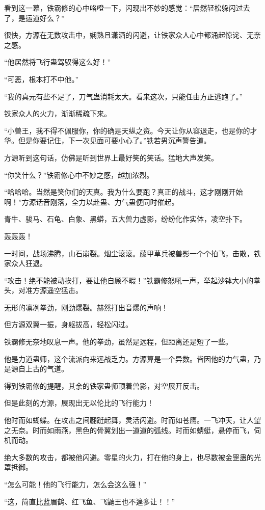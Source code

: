 \begin{this_body}
看到这一幕，铁霸修的心中咯噔一下，闪现出不妙的感觉：“居然轻松躲闪过去了，是运道好么？”

很快，方源在无数攻击中，娴熟且潇洒的闪避，让铁家众人心中都涌起惊诧、无奈之感。

“他居然将飞行蛊驾驭得这么好！”

“可恶，根本打不中他。”

“我的真元有些不足了，刀气蛊消耗太大。看来这次，只能任由方正逃跑了。”

铁家众人的火力，渐渐稀疏下来。

“小兽王，我不得不佩服你，你的确是天纵之资。今天让你从容退走，也是你的才华。但是你要记住，下一次见面可要小心了。”铁若男沉声警告道。

方源听到这句话，仿佛是听到世界上最好笑的笑话。猛地大声发笑。

“你笑什么？”铁霸修心中不妙之感，越加浓烈。

“哈哈哈。当然是笑你们的天真。我为什么要跑？真正的战斗，这才刚刚开始啊！”方源话音刚落，全力以赴蛊、力气蛊便同时催起。

青牛、骏马、石龟、白象、黑蟒，五大兽力虚影，纷纷化作实体，凌空扑下。

轰轰轰！

一时间，战场沸腾，山石崩裂。烟尘滚滚。藤甲草兵被兽影一个个拍飞，击散，铁家众人狂退。

“攻击！绝不能被动挨打，要让他自顾不暇！”铁霸修怒吼一声，举起沙钵大小的拳头，对准方源遥空猛击。

无形的凛冽拳劲，刚劲爆裂。赫然打出音爆的声响！

但方源双翼一振，身躯拔高，轻松闪过。

铁霸修无奈地叹息一声。他的拳劲，虽然是远程，但距离还是短了一些。

他是力道蛊师，这个流派向来远战乏力。方源算是一个异数。皆因他的力气蛊，乃是源自上古的气道。

得到铁霸修的提醒，其余的铁家蛊师顶着兽影，对空展开反击。

但是此刻的方源，展现出无以伦比的飞行能力！

他时而如蝴蝶。在攻击之间翩跹起舞，灵活闪避。时而如苍鹰。一飞冲天，让人望之无奈。时而如雨燕，黑色的骨翼划出一道道的弧线。时而如蜻蜓，悬停而飞，伺机而动。

绝大多数的攻击，都被他闪避。零星的火力，打在他的身上，也尽数被金罡蛊的光罩抵御。

“怎么可能！他的飞行能力，怎么会这么强！”

“这，简直比蓝眉鹤、红飞鱼、飞鼬王也不遑多让！！”


\end{this_body}
